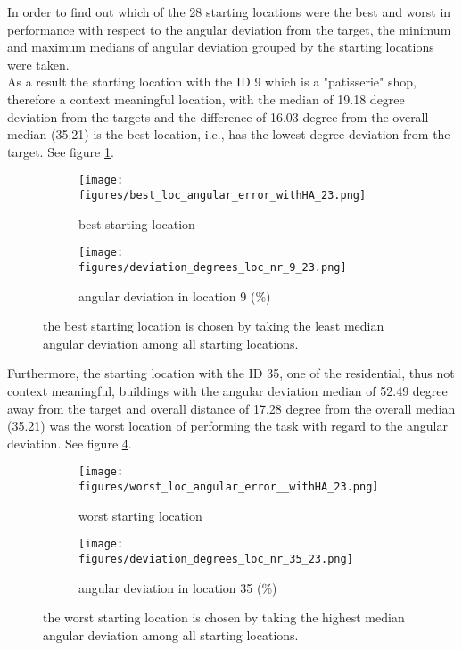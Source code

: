 In order to find out which of the 28 starting locations were the best and worst in performance with respect to the angular deviation from the target, the minimum and maximum medians of angular deviation grouped by the starting locations were taken.\\
As a result the starting location with the ID 9 which is a "patisserie" shop, therefore a context meaningful location, with the median of 19.18 degree deviation from the targets and the difference of 16.03 degree from the overall median (35.21) is the best location, i.e., has the lowest degree deviation from the target. See figure \ref{fig:best_angular}.\\

\begin{figure}[h!]
	\centering
	\begin{subfigure}[b]{0.48\linewidth}
		\texttt{[image: figures/best\_loc\_angular\_error\_withHA\_23.png]}
		\caption{best starting location}
		\label{fig:best_angular}
	\end{subfigure}
	\begin{subfigure}[b]{0.48\linewidth}
		\texttt{[image: figures/deviation\_degrees\_loc\_nr\_9\_23.png]}
		\caption{angular deviation in location 9 (\%)}
		\label{fig:best_angular_dist_9}
	\end{subfigure}
	
	\caption[Best starting location based on angular deviation]{the best starting location is chosen by taking the least median angular deviation among all starting locations.}
\end{figure}
\label{fig:best_location}

Furthermore, the starting location with the ID 35, one of the residential, thus not context meaningful, buildings with the angular deviation median of 52.49 degree away from the target and overall distance of 17.28 degree from the overall median (35.21) was the worst location of performing the task with regard to the angular deviation. See figure \ref{fig:worst_angular}.

\begin{figure}[!h]
	\begin{subfigure}[b]{0.48\linewidth}
		\texttt{[image: figures/worst\_loc\_angular\_error\_\_withHA\_23.png]}
		\caption{worst starting location}
		\label{fig:worst_angular}
	\end{subfigure}
	\begin{subfigure}[b]{0.48\linewidth}
		\texttt{[image: figures/deviation\_degrees\_loc\_nr\_35\_23.png]}
		\caption{angular deviation in location 35 (\%)}
		\label{fig:worst_angular_dist_35}
	\end{subfigure}

	\caption[Worst starting location based on angular deviation]{the worst starting location is chosen by taking the highest median angular deviation among all starting locations.}
\end{figure}
\label{fig:worst_location}

